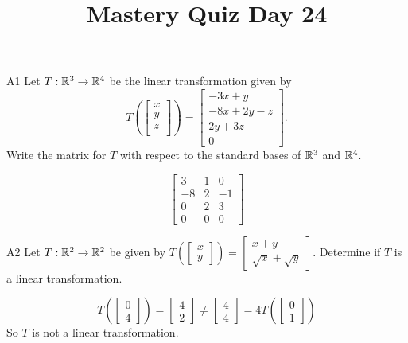 \documentclass{sbgLAquiz}
\title{Mastery Quiz Day 24 }
\begin{document}
\begin{problem}{A1}
Let $T: \mathbb{R}^3\rightarrow \mathbb{R}^4$ be the linear transformation given by $$T\left(\begin{bmatrix} x \\ y \\ z \\  \end{bmatrix} \right) = \begin{bmatrix} -3x+y \\ -8x+2y-z \\ 2y+3z \\ 0 \end{bmatrix}.$$  Write the matrix for $T$ with respect to the standard bases of $\mathbb{R}^3$ and $\mathbb{R}^4$.
\end{problem}
\begin{solution}
$$\begin{bmatrix} 3 & 1 & 0 \\ -8 & 2 & -1 \\ 0 & 2 & 3 \\ 0 & 0 & 0 \end{bmatrix}$$
\end{solution}

\begin{problem}{A2} 
Let $T: \mathbb{R}^2 \rightarrow \mathbb{R}^2$ be given by $T\left(\begin{bmatrix}x \\ y  \end{bmatrix} \right) = \begin{bmatrix} x+y \\ \sqrt{x}+\sqrt{y} \end{bmatrix}$.  Determine if $T$ is a linear transformation.
\end{problem}
\begin{solution}
$$T\left(\begin{bmatrix} 0 \\ 4 \end{bmatrix}\right) = \begin{bmatrix} 4 \\ 2 \end{bmatrix} \neq \begin{bmatrix} 4 \\ 4 \end{bmatrix} = 4T\left(\begin{bmatrix} 0 \\ 1 \end{bmatrix} \right)$$
So $T$ is not a linear transformation.
\end{solution}
\end{document}
